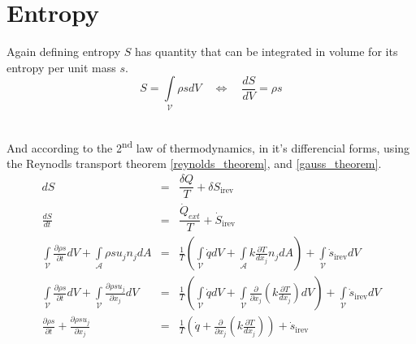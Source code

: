 \section{Entropy}
Again defining entropy $S$ has quantity that can be integrated in volume for its entropy per unit mass $s$. 
\begin{equation}
    S=\int\limits_{\mathcal{V}}\rho s dV \quad  \Leftrightarrow \quad  \frac{dS}{dV}= \rho s 
\end{equation}\

And according to the 2\textsuperscript{nd} law of thermodynamics, in it's differencial forms, using the Reynodls transport theorem \eqref{reynolds_theorem}, and \eqref{gauss_theorem}.
\begin{eqnarray}
    \label{differential_entropy}
    dS &=& \dfrac{\delta Q}{T} + \delta S_{\text{irev}}\\
    \frac{dS}{dt} &=& \dfrac{\dot{Q}_{ext}}{T} + \dot{S}_{\text{irev}}\\
    \int\limits_{\mathcal{V}} \frac{\partial \rho s}{\partial t} dV + 
    \int\limits_{\mathcal{A}} \rho s u_j n_j dA &=&
    \frac{1}{T}\left(\int\limits_{\mathcal{V}} \dot{q} dV + \int\limits_{\mathcal{A}} k\frac{\partial T}{d x_j} n_j dA \right) + \int\limits_{\mathcal{V}} \dot{s}_{\text{irev}} dV\\
    \int\limits_{\mathcal{V}} \frac{\partial \rho s}{\partial t} dV + 
    \int\limits_{\mathcal{V}} \frac{\partial \rho s u_j}{\partial x_j} dV &=& \frac{1}{T}\left(\int\limits_{\mathcal{V}} \dot{q} dV + \int\limits_{\mathcal{V}} \frac{\partial} {\partial x_j} \left( k\frac{\partial T}{d x_j} \right) dV \right) + \int\limits_{\mathcal{V}} \dot{s}_{\text{irev}} dV \\
    \frac{\partial \rho s}{\partial t} +  \frac{\partial \rho s u_j}{\partial x_j} &=& \frac{1}{T}\left(\dot{q} + \frac{\partial} {\partial x_j} \left( k\frac{\partial T}{d x_j} \right) \right) + \dot{s}_{\text{irev}} 
\end{eqnarray}







